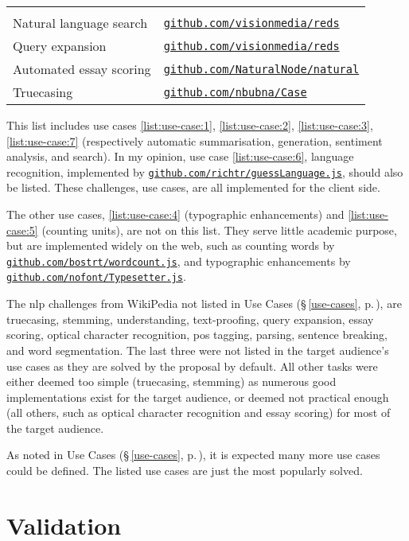 {\begin{tabular}{ l p{5.25cm} }
{  }\\
  Natural language search &{\raggedright
  \href{https://github.com/visionmedia/reds}{\nolinkurl{github.com/visionmedia/reds}}
  }\\
  Query expansion &{\raggedright
  \href{https://github.com/visionmedia/reds}{\nolinkurl{github.com/visionmedia/reds}}
  }\\
  Automated essay scoring &{\raggedright
  \href{https://github.com/NaturalNode/natural}{\nolinkurl{github.com/NaturalNode/natural}}
  }\\
  Truecasing &{\raggedright
  \href{https://github.com/nbubna/Case}{\nolinkurl{github.com/nbubna/Case}}
  }\\
\end{tabular}
}

\medskip\noindent This list includes use cases \ref{list:use-case:1},
  \ref{list:use-case:2}, \ref{list:use-case:3}, \ref{list:use-case:7}
  (respectively automatic summarisation, generation, sentiment analysis, and
  search).
In my opinion, use case \ref{list:use-case:6}, language recognition,
  implemented by
  \href{https://github.com/richtr/guessLanguage.js}{\nolinkurl{github.com/richtr/guessLanguage.js}},
  should also be listed.
These challenges, use cases, are all implemented for the client side.

The other use cases, \ref{list:use-case:4} (typographic enhancements) and
  \ref{list:use-case:5} (counting units), are not on this list.
They serve little academic purpose, but are implemented widely on the
  web, such as counting words by
  \href{https://github.com/bostrt/wordcount.js}{\nolinkurl{github.com/bostrt/wordcount.js}},
  and typographic enhancements by
  \href{https://github.com/nofont/Typesetter.js}{\nolinkurl{github.com/nofont/Typesetter.js}}.

The \gls{nlp} challenges from WikiPedia not listed in Use Cases
  (§\,\ref{use-cases}, p.\,\pageref{use-cases}), are truecasing,
  stemming, understanding, text-proofing, query expansion, essay scoring,
  optical character recognition, \gls{pos} tagging, parsing,
  sentence breaking, and word segmentation.
The last three were not listed in the target audience's use cases as they
  are solved by the proposal by default.
All other tasks were either deemed too simple (truecasing, stemming) as
  numerous good implementations exist for the target audience, or deemed not
  practical enough (all others, such as optical character recognition and
  essay scoring) for most of the target audience.

As noted in Use Cases (§\,\ref{use-cases}, p.\,\pageref{use-cases}), it is
  expected many more use cases could be defined.
The listed use cases are just the most popularly solved.

\section*{Validation}\label{addendum-validation}

\endgroup
